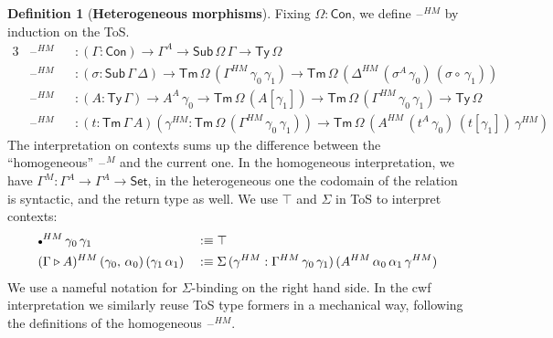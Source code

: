 \documentclass[12pt,a4paper,twoside,openany]{book}
\theoremstyle{remark}
\theoremstyle{definition}
\newtheorem{mydefinition}{Definition}
\theoremstyle{theorem}
\newcommand{\Con}{\mathsf{Con}}
\newcommand{\Sub}{\mathsf{Sub}}
\newcommand{\Tm}{\mathsf{Tm}}
\newcommand{\Ty}{\mathsf{Ty}}
\newcommand{\blank}{\mathord{\hspace{1pt}\text{--}\hspace{1pt}}}
\newcommand{\Set}{\mathsf{Set}}
\newcommand{\ext}{\triangleright}
\newcommand{\emptycon}{\scaleobj{.75}\bullet}
\newcommand{\defn}{:\equiv}
\begin{document}
\begin{mydefinition}[\textbf{Heterogeneous morphisms}]
Fixing $\Omega : \Con$, we define $\blank^{HM}$ by induction on the ToS.
\begin{alignat*}{3}
  &\blank^{HM} &&: (\Gamma : \Con) \to \Gamma^A \to \Sub\,\Omega\,\Gamma \to \Ty\,\Omega\\
  &\blank^{HM} &&: (\sigma : \Sub\,\Gamma\,\Delta) \to \Tm\,\Omega\,(\Gamma^{HM}\,\gamma_0\,\gamma_1) \to \Tm\,\Omega\,(\Delta^{HM}\,(\sigma^A\,\gamma_0)\,(\sigma \circ\,\gamma_1))\\
  &\blank^{HM} &&: (A : \Ty\,\Gamma) \to A^A\,\gamma_0 \to \Tm\,\Omega\,(A[\gamma_1])
  \to \Tm\,\Omega\,(\Gamma^{HM}\,\gamma_0\,\gamma_1) \to \Ty\,\Omega\\
  &\blank^{HM} &&: (t : \Tm\,\Gamma\,A)(\gamma^{HM} : \Tm\,\Omega\,(\Gamma^{HM}\,\gamma_0\,\gamma_1))
   \to \Tm\,\Omega\,(A^{HM}\,(t^A\,\gamma_0)\,(t[\gamma_1])\,\gamma^{HM})
\end{alignat*}
The interpretation on contexts sums up the difference between the
``homogeneous'' $\blank^{M}$ and the current one. In the homogeneous
interpretation, we have $\Gamma^{M} : \Gamma^A \to \Gamma^A \to \Set$, in the
heterogeneous one the codomain of the relation is syntactic, and the return type
as well. We use $\top$ and $\Sigma$ in ToS to interpret contexts:
\begin{alignat*}{3}
  &\emptycon^{HM}\,\gamma_0\,\gamma_1 &&\defn \top\\
  &(\Gamma\ext A)^{HM}\,(\gamma_0,\,\alpha_0)\,(\gamma_1\,\alpha_1) &&\defn
    \Sigma\,(\gamma^{HM} : \Gamma^{HM}\,\gamma_0\,\gamma_1)\,(A^{HM}\,\alpha_0\,\alpha_1\,\gamma^{HM})
\end{alignat*}
We use a nameful notation for $\Sigma$-binding on the right hand side. In the
cwf interpretation we similarly reuse ToS type formers in a mechanical way,
following the definitions of the homogeneous $\blank^{HM}$.


\end{mydefinition}
\end{document}

